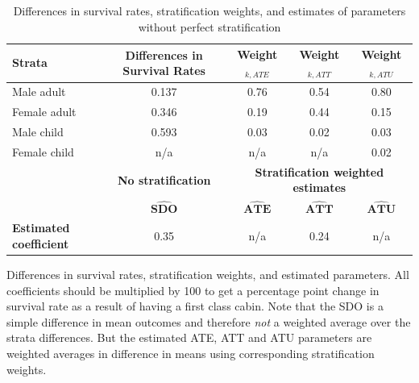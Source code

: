 \documentclass{beamer}
\begin{document}
\begin{frame}

\begin{table}\tiny{}
\caption{Differences in survival rates, stratification weights, and estimates of parameters without perfect stratification}
\centering
\begin{threeparttable}
\begin{tabular}{lc|ccc}
\toprule
\multicolumn{1}{l}{\textbf{Strata}}&
\multicolumn{1}{c}{\textbf{Differences in Survival Rates}}&
\multicolumn{1}{c}{\textbf{Weight$_{k,ATE}$}}&
\multicolumn{1}{c}{\textbf{Weight$_{k,ATT}$}}&
\multicolumn{1}{c}{\textbf{Weight$_{k,ATU}$}}\\
\midrule
Male adult		& 0.137 	&	0.76 &	0.54	&0.80	\\
Female adult	& 0.346 	&	0.19 &	0.44	&0.15	\\
Male child		& 0.593 	&	0.03 &	0.02	&0.03	\\
Female child	& n/a 	&	n/a 	&	n/a	&0.02	\\
\midrule
\multicolumn{1}{l}{\textbf{}}&
\multicolumn{1}{c}{\textbf{No stratification}}&
\multicolumn{3}{c}{\textbf{Stratification weighted estimates}}\\

 & $\widehat{\textbf{SDO}}$& $\widehat{\textbf{ATE}}$ & $\widehat{\textbf{ATT}}$ & $\widehat{\textbf{ATU}}$ \\
\midrule
\textbf{Estimated coefficient}& 0.35 & n/a & 	0.24	 & n/a  \\
\bottomrule
\end{tabular}
\begin{tablenotes}
\tiny
\item 
Differences in survival rates, stratification weights, and estimated parameters. All coefficients should be multiplied by 100 to get a percentage point change in survival rate as a result of having a first class cabin. Note that the SDO is a simple difference in mean outcomes and therefore \emph{not} a weighted average over the strata differences.  But the estimated ATE, ATT and ATU parameters are weighted averages in difference in means using corresponding stratification weights. 
\end{tablenotes}
\end{threeparttable}
\label{tab:titanic-weights2}
\end{table}


\end{frame}
\end{document}
